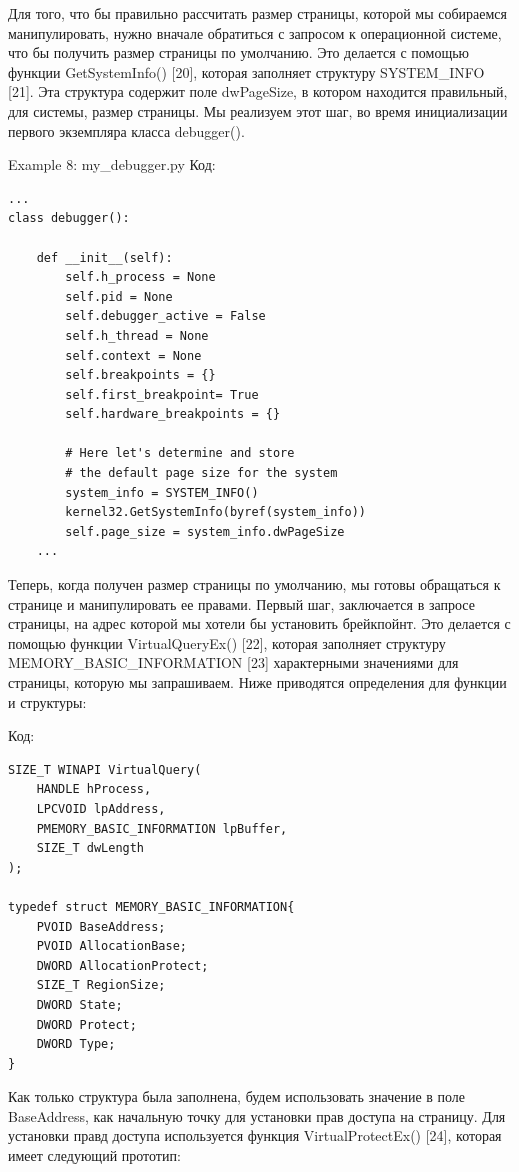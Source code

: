 \documentclass[12pt, a4paper, oneside]{book}
\begin{document}
Для того, что бы правильно рассчитать размер страницы, которой мы собираемся манипулировать, нужно вначале обратиться с запросом к операционной системе, что бы получить размер страницы по умолчанию. Это делается с помощью функции GetSystemInfo() [20], которая заполняет структуру SYSTEM\_INFO [21]. Эта структура содержит поле dwPageSize, в котором находится правильный, для системы, размер страницы. Мы реализуем этот шаг, во время инициализации первого экземпляра класса debugger().

Example 8: my\_debugger.py
Код:
\begin{verbatim}
...
class debugger():

    def __init__(self):
        self.h_process = None
        self.pid = None
        self.debugger_active = False
        self.h_thread = None
        self.context = None
        self.breakpoints = {}
        self.first_breakpoint= True
        self.hardware_breakpoints = {}

        # Here let's determine and store
        # the default page size for the system
        system_info = SYSTEM_INFO()
        kernel32.GetSystemInfo(byref(system_info))
        self.page_size = system_info.dwPageSize
    ...
\end{verbatim}

Теперь, когда получен размер страницы по умолчанию, мы готовы обращаться к странице и манипулировать ее правами. Первый шаг, заключается в запросе страницы, на адрес которой мы хотели бы установить брейкпойнт. Это делается с помощью функции VirtualQueryEx() [22], которая заполняет структуру MEMORY\_BASIC\_INFORMATION [23] характерными значениями для страницы, которую мы запрашиваем. Ниже приводятся определения для функции и структуры:

Код:
\begin{verbatim}
SIZE_T WINAPI VirtualQuery(
    HANDLE hProcess,
    LPCVOID lpAddress,
    PMEMORY_BASIC_INFORMATION lpBuffer,
    SIZE_T dwLength
);

typedef struct MEMORY_BASIC_INFORMATION{
    PVOID BaseAddress;
    PVOID AllocationBase;
    DWORD AllocationProtect;
    SIZE_T RegionSize;
    DWORD State;
    DWORD Protect;
    DWORD Type;
}
\end{verbatim}

Как только структура была заполнена, будем использовать значение в поле BaseAddress, как начальную точку для установки прав доступа на страницу. Для установки правд доступа используется функция VirtualProtectEx() [24], которая имеет следующий прототип:
\end{document}
